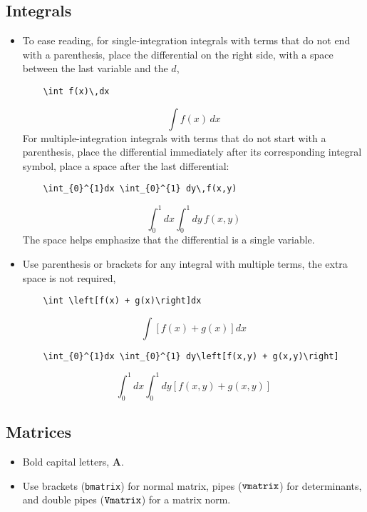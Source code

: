 \documentclass[10pt, letter]{article}
\begin{document}
\begin{multicols}{2}
\subsection{Integrals}\label{sec:integrals}
\begin{itemize}
\item To ease reading, for single-integration integrals with terms that do not
  end with a parenthesis,  place the differential on the right side, with a space between the
  last variable and the $d$,
  \begin{lstlisting}
    \int f(x)\,dx
\end{lstlisting}
  \begin{equation*}
    \int f(x)\,dx
  \end{equation*}
  For multiple-integration integrals with terms that do not start with
  a parenthesis, place the differential immediately after its corresponding
  integral symbol, place a space after the last differential:
\begin{lstlisting}
    \int_{0}^{1}dx \int_{0}^{1} dy\,f(x,y)
\end{lstlisting}
  \begin{equation*}
    \int_{0}^{1}dx \int_{0}^{1} dy\,f(x,y)
  \end{equation*}
  The space helps emphasize that the differential is a single variable. 
\item Use parenthesis or brackets for any integral with multiple
  terms, the extra space is not required,
\begin{lstlisting}
    \int \left[f(x) + g(x)\right]dx
\end{lstlisting}
  \begin{equation*}
    \int \left[f(x) + g(x)\right]dx
  \end{equation*}
\begin{lstlisting}
    \int_{0}^{1}dx \int_{0}^{1} dy\left[f(x,y) + g(x,y)\right]
\end{lstlisting}
  \begin{equation*}
    \int_{0}^{1}dx \int_{0}^{1} dy\left[f(x,y) + g(x,y)\right]
  \end{equation*}
\end{itemize}




\subsection{Matrices}
\begin{itemize}
\item Bold capital letters, $\mathbf{A}$.
\item Use brackets (\verb|bmatrix|) for normal matrix, pipes
  ($\verb|vmatrix|$) for
  determinants, and double pipes ($\verb|Vmatrix|$) for a matrix norm.
\end{itemize}


\end{multicols}
\end{document}
